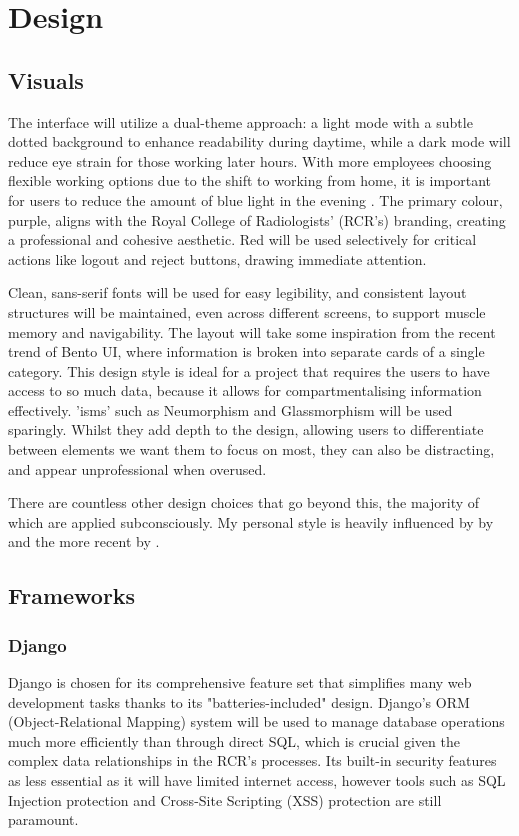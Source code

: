 \chapter{Design}
\section{Visuals}
The interface will utilize a dual-theme approach: a light mode with a subtle dotted background to enhance readability during daytime, while a dark mode will reduce eye strain for those working later hours. With more employees choosing flexible working options due to the shift to working from home, it is important for users to reduce the amount of blue light in the evening \parencite{cipd2023flexible}. The primary colour, purple, aligns with the Royal College of Radiologists' (RCR’s) branding, creating a professional and cohesive aesthetic. Red will be used selectively for critical actions like logout and reject buttons, drawing immediate attention.

Clean, sans-serif fonts will be used for easy legibility, and consistent layout structures will be maintained, even across different screens, to support muscle memory and navigability. The layout will take some inspiration from the recent trend of Bento UI, where information is broken into separate cards of a single category. This design style is ideal for a project that requires the users to have access to so much data, because it allows for compartmentalising information effectively. 'isms' such as Neumorphism and Glassmorphism will be used sparingly. Whilst they add depth to the design, allowing users to differentiate between elements we want them to focus on most, they can also be distracting, and appear unprofessional when overused.

There are countless other design choices that go beyond this, the majority of which are applied subconsciously. My personal style is heavily influenced by  by \textcite{muller-brockmann_grid_1981} and the more recent  by \textcite{wathan_refactoring_2018}.
\section{Frameworks}
\subsection{Django} \label{Django}
Django is chosen for its comprehensive feature set that simplifies many web development tasks thanks to its "batteries-included" design. Django’s ORM (Object-Relational Mapping) system will be used to manage database operations much more efficiently than through direct SQL, which is crucial given the complex data relationships in the RCR’s processes. Its built-in security features as less essential as it will have limited internet access, however tools such as SQL Injection protection and Cross-Site Scripting (XSS) protection are still paramount.

